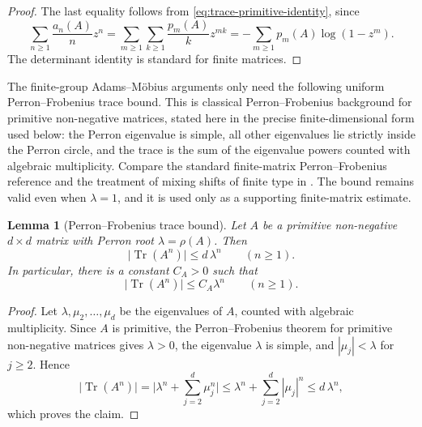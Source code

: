 \documentclass[11pt,a4paper]{amsart}
\theoremstyle{plain}
\newtheorem{lemma}[theorem]{Lemma}
\theoremstyle{definition}
\theoremstyle{remark}
\DeclareMathOperator{\Tr}{Tr}
\newcommand{\abs}[1]{\lvert #1 \rvert}
\begin{document}
\begin{proof}
  The last equality follows from \eqref{eq:trace-primitive-identity},
  since
  \[
    \sum_{n\ge 1}\frac{a_n(A)}{n}z^n
    =\sum_{m\ge 1}\sum_{k\ge 1}\frac{p_m(A)}{k}z^{mk}
    =-\sum_{m\ge 1}p_m(A)\log(1-z^m).
  \]
  The determinant identity is standard for finite matrices.
\end{proof}

The finite-group Adams--M\"obius arguments only need the following
uniform Perron--Frobenius trace bound.  This is classical
Perron--Frobenius background for primitive non-negative matrices, stated
here in the precise finite-dimensional form used below: the Perron
eigenvalue is simple, all other eigenvalues lie strictly inside the Perron
circle, and the trace is the sum of the eigenvalue powers counted with
algebraic multiplicity.  Compare the standard finite-matrix
Perron--Frobenius reference \cite{Seneta2006NonnegativeMatrices} and the
treatment of mixing shifts of finite type in
\cite{LindMarcus1995,ParryPollicott1990Zeta}.
The bound remains valid even when \(\lambda=1\), and it is used only as a
supporting finite-matrix estimate.

\begin{lemma}[Perron--Frobenius trace bound]
  \label{lem:pf-trace-bound}
  Let \(A\) be a primitive non-negative \(d\times d\) matrix with
  Perron root \(\lambda=\rho(A)\). Then
  \[
    \abs{\Tr(A^n)}\le d\,\lambda^n
    \qquad (n\ge 1).
  \]
  In particular, there is a constant \(C_A>0\) such that
  \[
    \abs{\Tr(A^n)}\le C_A\lambda^n
    \qquad (n\ge 1).
  \]
\end{lemma}

\begin{proof}
  Let \(\lambda,\mu_2,\dots,\mu_d\) be the eigenvalues of \(A\), counted
  with algebraic multiplicity. Since \(A\) is primitive,
  the Perron--Frobenius theorem for primitive non-negative matrices
  \cite{Seneta2006NonnegativeMatrices} gives \(\lambda>0\), the eigenvalue
  \(\lambda\) is simple, and \(|\mu_j|<\lambda\) for \(j\ge 2\). Hence
  \[
    \abs{\Tr(A^n)}
    =
    \abs{\lambda^n+\sum_{j=2}^d\mu_j^n}
    \le
    \lambda^n+\sum_{j=2}^d|\mu_j|^n
    \le
    d\,\lambda^n,
  \]
  which proves the claim.
\end{proof}
\end{document}

